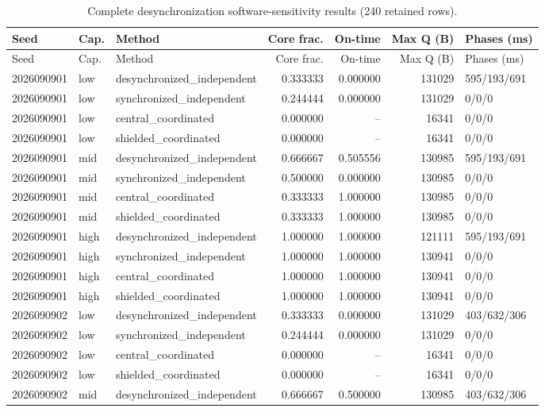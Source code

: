 \begin{longtable}{llp{38mm}rrrp{30mm}}
\caption{Complete desynchronization software-sensitivity results (240 retained rows).}\label{tab:desyncfull}\\
\toprule
Seed & Cap. & Method & Core frac. & On-time & Max Q (B) & Phases (ms) \\
\midrule
\endfirsthead
\toprule
Seed & Cap. & Method & Core frac. & On-time & Max Q (B) & Phases (ms) \\
\midrule
\endhead
2026090901 & low & desynchronized\_independent & 0.333333 & 0.000000 & 131029 & 595/193/691 \\
2026090901 & low & synchronized\_independent & 0.244444 & 0.000000 & 131029 & 0/0/0 \\
2026090901 & low & central\_coordinated & 0.000000 & -- & 16341 & 0/0/0 \\
2026090901 & low & shielded\_coordinated & 0.000000 & -- & 16341 & 0/0/0 \\
2026090901 & mid & desynchronized\_independent & 0.666667 & 0.505556 & 130985 & 595/193/691 \\
2026090901 & mid & synchronized\_independent & 0.500000 & 0.000000 & 130985 & 0/0/0 \\
2026090901 & mid & central\_coordinated & 0.333333 & 1.000000 & 130985 & 0/0/0 \\
2026090901 & mid & shielded\_coordinated & 0.333333 & 1.000000 & 130985 & 0/0/0 \\
2026090901 & high & desynchronized\_independent & 1.000000 & 1.000000 & 121111 & 595/193/691 \\
2026090901 & high & synchronized\_independent & 1.000000 & 1.000000 & 130941 & 0/0/0 \\
2026090901 & high & central\_coordinated & 1.000000 & 1.000000 & 130941 & 0/0/0 \\
2026090901 & high & shielded\_coordinated & 1.000000 & 1.000000 & 130941 & 0/0/0 \\
2026090902 & low & desynchronized\_independent & 0.333333 & 0.000000 & 131029 & 403/632/306 \\
2026090902 & low & synchronized\_independent & 0.244444 & 0.000000 & 131029 & 0/0/0 \\
2026090902 & low & central\_coordinated & 0.000000 & -- & 16341 & 0/0/0 \\
2026090902 & low & shielded\_coordinated & 0.000000 & -- & 16341 & 0/0/0 \\
2026090902 & mid & desynchronized\_independent & 0.666667 & 0.500000 & 130985 & 403/632/306 \\

\end{longtable}
